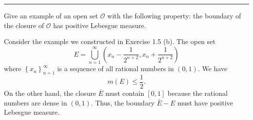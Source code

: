\documentclass[letterpaper, 12pt]{article}
\begin{document}
\noindent\rule{7in}{2.8pt}
\begin{problem}{1.9}
Give an example of an open set \(\mathcal{O}\) with the following property: the boundary of the closure of \(\mathcal{O}\) has positive Lebesgue measure.
\end{problem}
\begin{solution}
Consider the example we constructed in Exercise 1.5 (b). The open set 
\[E=\bigcup_{n=1}^\infty (x_n-\frac{1}{2^{n+2}},x_n+\frac{1}{2^{n+2}})\]
where \(\left\{ x_n \right\}_{n=1}^\infty\) is a sequence of all rational numbers in \((0,1)\). We have 
\[m(E)\leq \frac{1}{2}.\]
On the other hand, the closure \(\bar{E}\) must contain \([0,1]\) because the rational numbers are dense in \((0,1)\). Thus, the boundary \(\bar{E}-E\) must have positive Lebesgue measure.
\end{solution}
\end{document}
